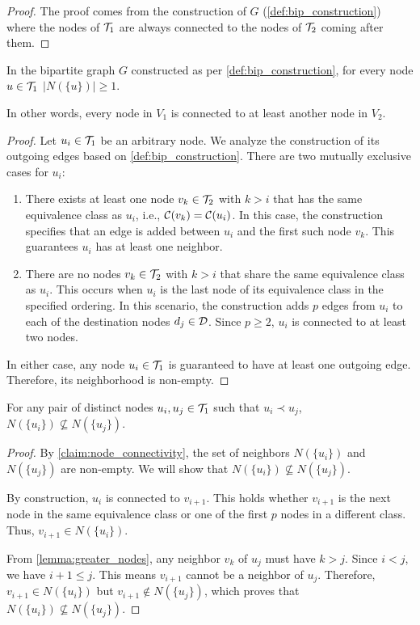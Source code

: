 \begin{proof}
    The proof comes from the construction of $G$ (\cref{def:bip_construction}) where the nodes of $\mathcal{T}_{1}$ are always connected to the nodes of $\mathcal{T}_{2}$ coming after them.
\end{proof}

\begin{lemma} \label{claim:node_connectivity}
    In the bipartite graph $G$ constructed as per \cref{def:bip_construction}, for every node $u \in \mathcal{T}_{1}$ $|N(\{u\})| \geq 1$.
\end{lemma}
In other words, every node in $V_1$ is connected to at least another node in $V_2$.
\begin{proof}
    Let $u_i \in \mathcal{T}_{1}$ be an arbitrary node. We analyze the construction of its outgoing edges based on \cref{def:bip_construction}. There are two mutually exclusive cases for $u_i$:
    \begin{enumerate}[leftmargin=25pt]
        \item There exists at least one node $v_k \in \mathcal{T}_{2}$ with $k > i$ that has the same equivalence class as $u_i$, i.e., $\mathcal{C}(v_k) = \mathcal{C}(u_i)$. In this case, the construction specifies that an edge is added between $u_i$ and the first such node $v_k$. This guarantees $u_i$ has at least one neighbor.
        \item There are no nodes $v_k \in \mathcal{T}_{2}$ with $k > i$ that share the same equivalence class as $u_i$. This occurs when $u_i$ is the last node of its equivalence class in the specified ordering. In this scenario, the construction adds $p$ edges from $u_i$ to each of the destination nodes $d_j \in \mathcal{D}$. Since $p \geq 2$, $u_i$ is connected to at least two nodes.
    \end{enumerate}
    In either case, any node $u_i \in \mathcal{T}_{1}$ is guaranteed to have at least one outgoing edge. Therefore, its neighborhood is non-empty.
\end{proof}

\begin{lemma} \label{lemma:distinct_neighborhoods}
    For any pair of distinct nodes $u_i, u_j \in \mathcal{T}_{1}$ such that $u_i \prec u_j$, $N(\{u_i\}) \not\subseteq N(\{u_j\})$.
\end{lemma}
\begin{proof}
    By \cref{claim:node_connectivity}, the set of neighbors $N(\{u_i\})$ and $N(\{u_j\})$ are non-empty. We will show that $N(\{u_i\}) \not\subseteq N(\{u_j\})$. 
    
    By construction, $u_i$ is connected to $v_{i+1}$. This holds whether $v_{i+1}$ is the next node in the same equivalence class or one of the first $p$ nodes in a different class. Thus, $v_{i+1} \in N(\{u_i\})$.

    From \cref{lemma:greater_nodes}, any neighbor $v_k$ of $u_j$ must have $k > j$. Since $i < j$, we have $i+1 \leq j$. This means $v_{i+1}$ cannot be a neighbor of $u_j$. Therefore, $v_{i+1} \in N(\{u_i\})$ but $v_{i+1} \notin N(\{u_j\})$, which proves that $N(\{u_i\}) \not\subseteq N(\{u_j\})$.
\end{proof}

